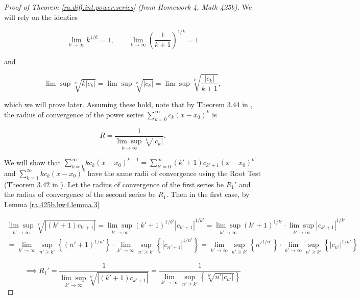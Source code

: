 \begin{proof}[Proof of Theorem \ref{ra.diff.int.power.series} (from Homework 4, Math 425b)]

We will rely on the identies 

\begin{equation}\label{ra.425b.hw4.eqn.4}
\lim_{k \to \infty} k^{1/k} = 1, \qquad \lim_{k \to \infty} \left(\frac{1}{k+1} \right)^{1/k} = 1 
\end{equation}

and

\begin{equation}\label{ra.425b.hw4.eqn.5}
\lim \sup \sqrt[k]{k |c_k|} = \lim \sup \sqrt[k]{|c_k|} = \lim \sup \sqrt[k]{\frac{|c_k|}{k+1}},
\end{equation}

which we will prove later. Assuming these hold, note that by Theorem 3.44 in \citet{pugh2015real}, the radius of convergence of the power series $\sum_{k=0}^{\infty} c_k (x-x_0)^k$ is

\[
R = \frac{1}{\underset{k \to \infty}{\lim \sup} \sqrt[k]{|c_k|}}.
\]

We will show that \(\sum_{k=1}^{\infty} kc_k (x-x_0)^{k-1} = \sum_{k'=0}^{\infty} (k' + 1)c_{k' + 1} (x-x_0)^{k'}\) and \(\sum_{k=1}^{\infty} kc_k (x-x_0)^{k}\) have the same radii of convergence using the Root Test (Theorem 3.42 in \citet{pugh2015real}). Let the radius of convergence of the first series be \(R_1'\) and the radius of convergence of the second series be \(R_1\). Then in the first case, by Lemma \ref{ra.425b.hw4.lemma.3}

\begin{multline*}
\underset{k' \to \infty}{\lim \sup}  \sqrt[k']{ |(k' + 1)c_{k' + 1} |} = \underset{k' \to \infty}{\lim \sup} (k' + 1)^{1/k'} |c_{k' + 1} |^{1/k'} = \underset{k' \to \infty}{\lim \sup} (k' + 1)^{1/k'}  \cdot \underset{k' \to \infty}{\lim \sup}  |c_{k' + 1} |^{1/k'}
\\ = \lim_{k' \to \infty} \sup_{n' \geq k'} \left\{ (n' + 1)^{1/n'}  \right\} \cdot \lim_{k' \to \infty} \sup_{n' \geq k'} \left\{  |c_{n' + 1} |^{1/n'} \right\} = \lim_{k' \to \infty} \sup_{n' \geq k'} \left\{ {n'} ^{1/n'}  \right\} \cdot \lim_{k' \to \infty} \sup_{n' \geq k'} \left\{  |c_{n' } |^{1/n'} \right\}
\end{multline*}





\[
\implies R_1' = \frac{1}{\underset{k' \to \infty}{\lim \sup} \sqrt[k']{| (k' + 1)c_{k' + 1}|}} = \frac{1}{ \lim_{k' \to \infty} \sup_{n' \geq k'} \left\{ \sqrt[n']{n'  | c_{n' }|} \right\} }
\]




\end{proof}
